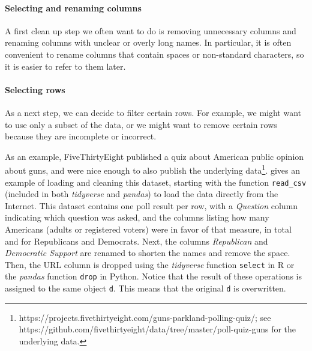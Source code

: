 \paragraph{Selecting and renaming columns}
A first clean up step we often want to do is removing unnecessary columns and renaming columns with unclear or overly long names.
In particular, it is often convenient to rename columns that contain spaces or non-standard characters, so it is easier to refer to them later.

\paragraph{Selecting rows}
As a next step, we can decide to filter certain rows.
For example, we might want to use only a subset of the data,
or we might want to remove certain rows because they are incomplete or incorrect.

As an example, FiveThirtyEight published a quiz about American public opinion about guns,
and were nice enough to also publish the underlying data\footnote{https://projects.fivethirtyeight.com/guns-parkland-polling-quiz/; see https://github.com/fivethirtyeight/data/tree/master/poll-quiz-guns for the underlying data.}.
 gives an example of loading and cleaning this dataset, starting with the function \texttt{read\_csv} (included in both \emph{tidyverse} and \emph{pandas}) to load the data directly from the Internet.
This dataset contains one poll result per row, with a \emph{Question} column indicating which question was asked,
and the columns listing how many Americans (adults or registered voters) were in favor of that measure, in total and for Republicans and Democrats.
Next, the columns \emph{Republican} and \emph{Democratic Support} are renamed to shorten the names and remove the space.
Then, the URL column is dropped using the \emph{tidyverse} function \texttt{select} in R or the \emph{pandas} function \texttt{drop} in Python.
Notice that the result of these operations is assigned to the same object \texttt{d}.
This means that the original \texttt{d} is overwritten.


